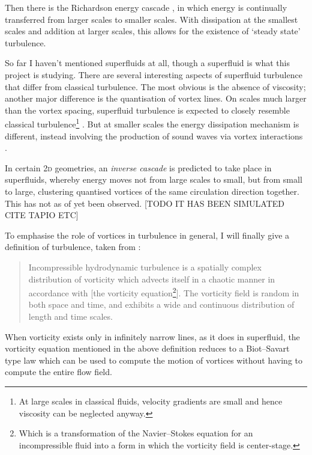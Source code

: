 Then there is the Richardson energy cascade \cite{richardson_weather_2007}, in which energy is continually transferred from larger scales to smaller scales. With dissipation at the smallest scales and addition at larger scales, this allows for the existence of `steady state' turbulence.

So far I haven't mentioned superfluids at all, though a superfluid is what this project is studying. There are several interesting aspects of superfluid turbulence that differ from classical turbulence. The most obvious is the absence of viscosity;  another major difference is the quantisation of vortex lines. On scales much larger than the vortex spacing, superfluid turbulence is expected to closely resemble classical turbulence\footnote{At large scales in classical fluids, velocity gradients are small and hence viscosity can be neglected anyway.} \cite{tsubota_energy_2009}. But at smaller scales the energy dissipation mechanism is different, instead involving the production of sound waves via vortex interactions \cite{tsubota_energy_2009, vinen_how_2005}.

In certain 2\textsc{d} geometries, an \emph{inverse cascade} \cite{onsager_statistical_1949, kraichnan_inertial_1967} is predicted to take place in superfluids, whereby energy moves not from large scales to small, but from small to large, clustering quantised vortices of the same circulation direction together. This has not as of yet been observed. [TODO IT HAS BEEN SIMULATED CITE TAPIO ETC]

To emphasise the role of vortices in turbulence in general, I will finally give a definition of turbulence, taken from \cite[p 53]{davidson_turbulence:_2004}:
\begin{quote}
Incompressible hydrodynamic turbulence is a spatially complex distribution of vorticity which advects itself in a chaotic manner in accordance with [the vorticity equation\footnote{Which is a transformation of the Navier--Stokes equation for an incompressible fluid into a form in which the vorticity field is center-stage.}]. The vorticity field is random in both space and time, and exhibits a wide and continuous distribution of length and time scales.
\end{quote}

When vorticity exists only in infinitely narrow lines, as it does in superfluid, the vorticity equation mentioned in the above definition reduces to a Biot--Savart type law which can be used to compute the motion of vortices without having to compute the entire flow field.

